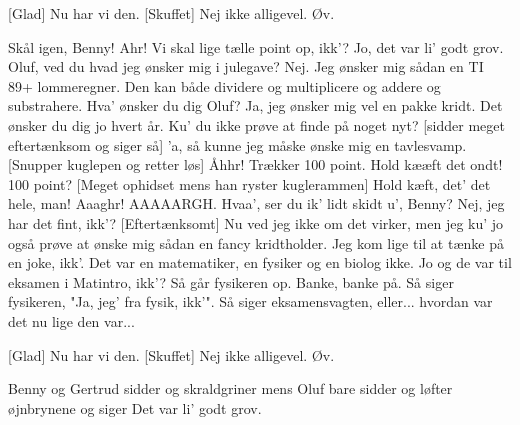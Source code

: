\documentclass[a4paper,11pt]{article}
\begin{document}
\begin{sketch}
[Glad] Nu har vi den.
[Skuffet] Nej ikke alligevel.
 Øv.

 Skål igen, Benny!
 Ahr! Vi skal lige tælle point op, ikk'? 
 Jo, det var li’ godt grov.
 Oluf, ved du hvad jeg ønsker mig i julegave? 
 Nej.
 Jeg ønsker mig sådan en TI 89+ lommeregner. Den kan både dividere og multiplicere og addere og substrahere. Hva' ønsker du dig Oluf?
 Ja, jeg ønsker mig vel en pakke kridt.
 Det ønsker du dig jo hvert år. Ku' du ikke prøve at finde på noget nyt?
[sidder meget eftertænksom og siger så]  'a, så kunne jeg måske ønske mig en tavlesvamp.
[Snupper kuglepen og retter løs] Åhhr! Trækker 100 point. Hold kææft det ondt!  100 point?
[Meget ophidset mens han ryster kuglerammen] Hold kæft, det' det hele, man! Aaaghr!  AAAAARGH.
 Hvaa', ser du ik' lidt skidt u', Benny?
 Nej, jeg har det fint, ikk'?
[Eftertænksomt] Nu ved jeg ikke om det virker, men jeg ku' jo også prøve at ønske mig sådan en fancy kridtholder.
 Jeg kom lige til at tænke på en joke, ikk'. Det var en matematiker, en fysiker og en biolog ikke. Jo og de var til eksamen i Matintro, ikk'? Så går fysikeren op. Banke, banke på. Så siger fysikeren, "Ja, jeg' fra fysik, ikk'". Så siger eksamensvagten, eller... hvordan var det nu lige den var...

[Glad] Nu har vi den.
[Skuffet] Nej ikke alligevel.
 Øv.

Benny og Gertrud sidder og skraldgriner mens Oluf bare sidder og løfter øjnbrynene og siger
 Det var li' godt grov.



\end{sketch}
\end{document}
